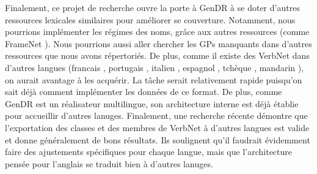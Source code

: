 Finalement, ce projet de recherche ouvre la porte à GenDR à se doter d'autres ressources lexicales similaires pour améliorer se couverture. Notamment, nous pourrions implémenter les régimes des noms, grâce aux autres ressources (comme FrameNet \cite{FillmoreBackgroundFramenet2003a}). Nous pourrions aussi aller chercher les \acp{GP} manquants dans d'autres ressources que nous avons répertoriés. De plus, comme il existe des VerbNet dans d'autres langues (francais \citep{danlos:hal-01179175}, portugais \citep{ScartoncrosslinguisticVerbNetstylelexicon}, italien \citep{busso2016italian}, espagnol \citep{TauleAnCoraNetMappingSpanish2010}, tchèque \citep{pala2008can}, mandarin \citep{liu2008construction}), on aurait avantage à les acquérir. La tâche serait relativement rapide puisqu'on sait déjà comment implémenter les données de ce format. De plus, comme GenDR est un réalisateur multilingue, son architecture interne est déjà établie pour accueillir d'autres lanuges. Finalement, une recherche récente \citep{Majewska2017} démontre que l'exportation des classes et des membres de VerbNet \citep{SchulerVerbnetBroadcoverageComprehensive2005} à d'autres langues est valide et donne généralement de bons résultats. Ils soulignent qu'il faudrait évidemment faire des ajustements spécifiques pour chaque langue, mais que l'architecture pensée pour l'anglais se traduit bien à d'autres lanuges.

